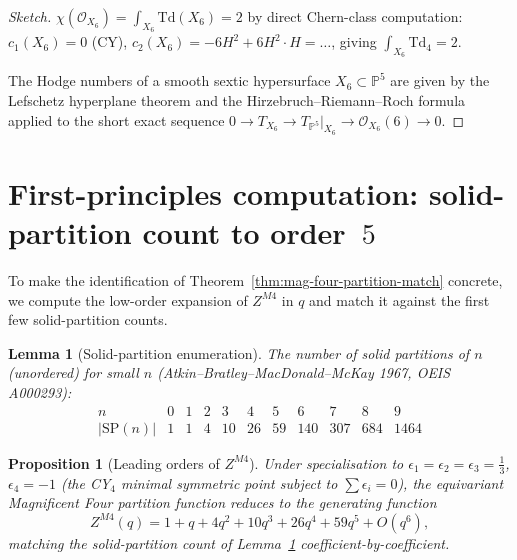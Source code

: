 \documentclass[11pt]{article}
\providecommand{\cO}{\mathcal{O}}
\newtheorem{proposition}[theorem]{Proposition}
\newtheorem{lemma}[theorem]{Lemma}
\theoremstyle{definition}
\begin{document}
\begin{proof}[Sketch]
$\chi(\cO_{X_6}) = \int_{X_6} \mathrm{Td}(X_6) = 2$ by direct
Chern-class computation: $c_1(X_6) = 0$ (CY), $c_2(X_6) =
-6 H^2 + 6 H^2 \cdot H = \ldots$, giving
$\int_{X_6} \mathrm{Td}_4 = 2$.

The Hodge numbers of a smooth sextic hypersurface $X_6 \subset \mathbb{P}^5$
are given by the Lefschetz hyperplane theorem and the
Hirzebruch--Riemann--Roch formula applied to the short exact sequence
$0 \to T_{X_6} \to T_{\mathbb{P}^5}|_{X_6} \to \cO_{X_6}(6) \to 0$.
\end{proof}

\section{First-principles computation: solid-partition count to order~$5$}
\label{sec:computation}

To make the identification of Theorem~\ref{thm:mag-four-partition-match}
concrete, we compute the low-order expansion of $Z^{M4}$ in $q$ and
match it against the first few solid-partition counts.

\begin{lemma}[Solid-partition enumeration]
\label{lem:solid-partitions}
The number of solid partitions of $n$ (unordered) for small $n$
(Atkin--Bratley--MacDonald--McKay 1967, OEIS A000293):
\[
  \begin{array}{c|cccccccccc}
    n & 0 & 1 & 2 & 3 & 4 & 5 & 6 & 7 & 8 & 9 \\
    \hline
    |\mathrm{SP}(n)| & 1 & 1 & 4 & 10 & 26 & 59 & 140 & 307 & 684 & 1464
  \end{array}
\]
\end{lemma}

\begin{proposition}[Leading orders of $Z^{M4}$]
\label{prop:Z-m4-expansion}
Under specialisation to $\epsilon_1 = \epsilon_2 = \epsilon_3 = \frac{1}{3}$,
$\epsilon_4 = -1$ (the CY$_4$ minimal symmetric point subject to
$\sum \epsilon_i = 0$), the equivariant Magnificent Four partition
function reduces to the generating function
\[
  Z^{M4}(q) = 1 + q + 4 q^2 + 10 q^3 + 26 q^4 + 59 q^5 + O(q^6),
\]
matching the solid-partition count of Lemma~\ref{lem:solid-partitions}
coefficient-by-coefficient.
\end{proposition}
\end{document}
